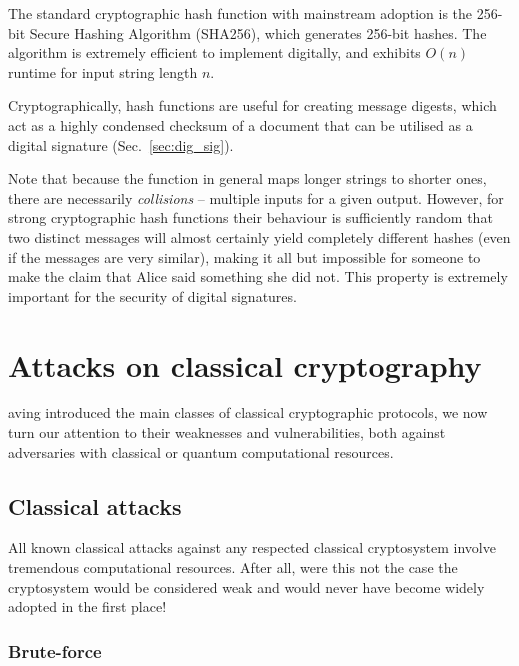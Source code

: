 The standard cryptographic hash function with mainstream adoption is the 256-bit Secure Hashing Algorithm (SHA256), which generates 256-bit hashes. The algorithm is extremely efficient to implement digitally, and exhibits $O(n)$ runtime for input string length $n$.

Cryptographically, hash functions are useful for creating message digests, which act as a highly condensed checksum of a document that can be utilised as a digital signature (Sec.~\ref{sec:dig_sig}).

Note that because the function in general maps longer strings to shorter ones, there are necessarily \textit{collisions} -- multiple inputs for a given output. However, for strong cryptographic hash functions their behaviour is sufficiently random that two distinct messages will almost certainly yield completely different hashes (even if the messages are very similar), making it all but impossible for someone to make the claim that Alice said something she did not. This property is extremely important for the security of digital signatures.

%
%

\section{Attacks on classical cryptography}\label{sec:attacks_on_class}

aving introduced the main classes of classical cryptographic protocols, we now turn our attention to their weaknesses and vulnerabilities, both against adversaries with classical or quantum computational resources.

%
%

\subsection{Classical attacks}

All known classical attacks against any respected classical cryptosystem involve tremendous computational resources. After all, were this not the case the cryptosystem would be considered weak and would never have become widely adopted in the first place!

%
%

\subsubsection{Brute-force}\label{sec:brute_force_attack}

